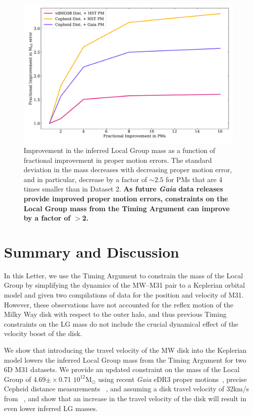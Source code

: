 \documentclass[twocolumn]{aastex631}
\newcommand{\msun}{\ensuremath{\textrm{M}_{\odot}}}
\begin{document}
\begin{figure}[htb]
    \centering
    \includegraphics[width=\columnwidth]{analyze-runs-deltaMvsPM.pdf}
    \caption{\label{fig:mvspm} Improvement in the inferred Local Group mass as a function of fractional improvement in proper motion errors.
    The standard deviation in the mass decreases with decreasing proper motion
    error, and in particular, decrease by a factor of $\sim2.5$ for PMs that are
    4 times smaller than in Dataset 2.
    \textbf{As future \textit{Gaia} data releases provide improved proper motion errors, constraints on the Local Group mass from the Timing Argument can
    improve by a factor of $>$2.}
    }
\end{figure}

\section{Summary and Discussion}
\label{sec:discussion}
In this Letter, we use the Timing Argument to constrain the mass of the Local
Group by
simplifying the dynamics of the MW--M31 pair to a Keplerian orbital model and
given two compilations of data for the position and velocity of M31.
However, these observations have not accounted for the reflex motion of the
Milky Way disk with respect to the outer halo, and thus previous Timing
constraints on
the LG mass do not include the crucial dynamical effect of the velocity boost
of the disk.

We show that introducing the travel velocity of the MW disk into the Keplerian
model lowers the inferred Local Group mass from the Timing Argument for two 6D
M31 datasets.
We provide an updated constraint on the mass of the Local Group of
4.69$\pm\times$0.71 $10^{12}\msun$ using recent \textit{Gaia} eDR3 proper
motions~\citep{Salomon2021}, precise Cepheid distance measurements
~\citep{Li2021}, and assuming a disk travel velocity of 32km/s from
~\cite{Petersen2021}, and show that an increase in the travel velocity of the
disk will result in even lower inferred LG masses.
\end{document}
